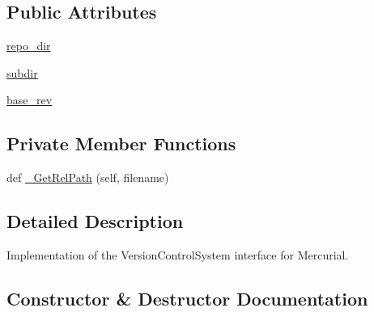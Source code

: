 \subsection*{Public Attributes}
\begin{DoxyCompactItemize}
\item 
\mbox{\hyperlink{classgoogletest-master_1_1googletest_1_1scripts_1_1upload_1_1_mercurial_v_c_s_aa596c5ad540c93a1d0943eb4a9c3c127}{repo\+\_\+dir}}
\item 
\mbox{\hyperlink{classgoogletest-master_1_1googletest_1_1scripts_1_1upload_1_1_mercurial_v_c_s_a3e978220d744541afbe65326d50e1d9f}{subdir}}
\item 
\mbox{\hyperlink{classgoogletest-master_1_1googletest_1_1scripts_1_1upload_1_1_mercurial_v_c_s_a72b4384769bcbca15146d0482fff4514}{base\+\_\+rev}}
\end{DoxyCompactItemize}
\subsection*{Private Member Functions}
\begin{DoxyCompactItemize}
\item 
def \mbox{\hyperlink{classgoogletest-master_1_1googletest_1_1scripts_1_1upload_1_1_mercurial_v_c_s_aa6270ee0d23f028be5744e29f9a25c09}{\+\_\+\+Get\+Rel\+Path}} (self, filename)
\end{DoxyCompactItemize}


\subsection{Detailed Description}
\begin{DoxyVerb}Implementation of the VersionControlSystem interface for Mercurial.\end{DoxyVerb}
 

\subsection{Constructor \& Destructor Documentation}
\mbox{\label{classgoogletest-master_1_1googletest_1_1scripts_1_1upload_1_1_mercurial_v_c_s_a9a727dfbcb0c2aaf8eac486d5faa68f0}} 
